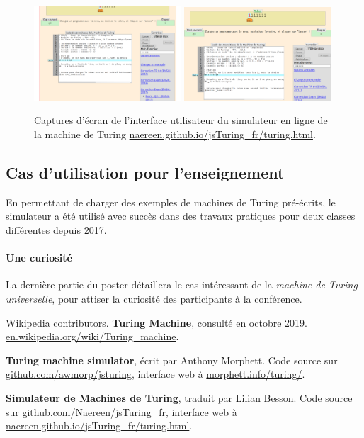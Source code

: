 \documentclass[runningheads]{llncs}
\begin{document}
\begin{figure}[!h]
    \centering
    \includegraphics[width=0.49\textwidth]{interactive_Turing_Machine_simulator_1.png}
    \includegraphics[width=0.49\textwidth]{interactive_Turing_Machine_simulator_2.png}
    \caption{Captures d'écran de l'interface utilisateur du simulateur en ligne de la machine de Turing \url{naereen.github.io/jsTuring_fr/turing.html}.}
    \label{fig:screenshots}
\end{figure}


\subsection*{Cas d'utilisation pour l'enseignement}

En permettant de charger des exemples de machines de Turing  pré-écrits, le simulateur a été utilisé avec succès dans des travaux pratiques pour deux classes différentes depuis 2017.


\paragraph{Une curiosité}

La dernière partie du poster détaillera le cas intéressant de la \emph{machine de Turing universelle}, pour attiser la curiosité des participants à la conférence.


%
%
% 
% 
%
\begin{thebibliography}{8}
    Wikipedia contributors.
    \textbf{Turing Machine}, consulté en octobre 2019.
    \url{en.wikipedia.org/wiki/Turing_machine}.

    \textbf{Turing machine simulator},
    écrit par Anthony Morphett.
    Code source sur \url{github.com/awmorp/jsturing},
    interface web à \url{morphett.info/turing/}.

    \textbf{Simulateur de Machines de Turing},
    traduit par Lilian Besson.
    Code source sur \url{github.com/Naereen/jsTuring_fr},
    interface web à \url{naereen.github.io/jsTuring_fr/turing.html}.
\end{thebibliography}
\end{document}
